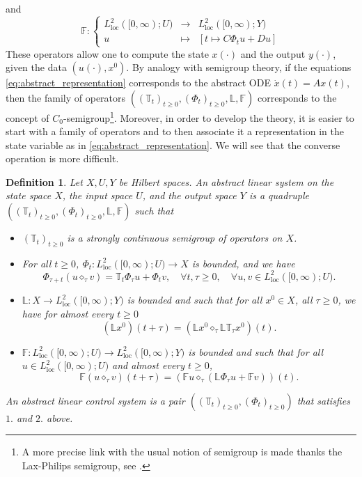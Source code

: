 \documentclass[10pt]{article}
\newcommand{\oploc}{\operatorname{loc}}
\newtheorem{Definition}[Theorem]{Definition}
\begin{document}
and 
\[
\mathbb{F} : \left\lbrace \begin{array}{ccc}
    L_{\oploc}^2([0,\infty);U) & \longrightarrow & L_{\oploc}^2([0,\infty);Y)  \\
    u & \longmapsto &  [t \mapsto C \Phi_t u+Du]
\end{array}\right.
\]
These operators allow one to compute the state $x(\cdot)$ and the output $y(\cdot)$, given the data $(u(\cdot),x^0)$. By analogy with semigroup theory, if the equations \eqref{eq:abstract_representation} corresponds to the abstract ODE $\dot{x}(t) = Ax(t)$, then the family of operators $((\mathbb{T}_t)_{t \geq 0},(\Phi_t)_{t \geq 0}, \mathbb{L}, \mathbb{F})$ corresponds to the concept of $C_0$-semigroup\footnote{A more precise link with the usual notion of semigroup is made thanks the Lax-Philips semigroup, see \cite[Chapter 2.7]{staffans2006well}.}. Moreover, in order to develop the theory, it is easier to start with a family of operators and to then associate it a representation in the state variable as in \eqref{eq:abstract_representation}. We will see that the converse operation is more difficult. 
\begin{Definition}\label{def:abstract_linear_system} Let $X,U,Y$ be Hilbert spaces. An abstract linear system on the state space $X$, the input space $U$, and the output space $Y$ is a quadruple $((\mathbb{T}_t)_{t \geq 0},(\Phi_t)_{t \geq 0},\mathbb{L}, \mathbb{F})$ such that 
\begin{itemize}
    \item[1.] $(\mathbb T_t)_{t\geq 0}$ is a strongly continuous semigroup of operators on $X$.
    \item[2.] For all $t \geq 0$, $\Phi_t : L^2_{\mathrm{loc}}([0,\infty);U) \rightarrow X$ is bounded, and we have 
    \begin{equation}\label{eq:composition}
\Phi_{\tau+t}(u \diamond_\tau v)
= \mathbb T_t \Phi_\tau u + \Phi_t v,\quad \forall t,\tau \geq 0,\quad \forall u,v \in L^2_{\oploc}([0,\infty);U).
\end{equation}
    \item[3.] $\mathbb{L} : X \rightarrow L_{\oploc}^2([0,\infty);Y)$ is bounded and such that for all $x^0 \in X$, all $\tau \geq 0$, we have for almost every $t \geq 0$
    \begin{equation*}
(\mathbb{L}x^0)(t+\tau)
= \left( \mathbb{L}x^0 \diamond_\tau {\mathbb L} \mathbb T_\tau x^0\right)(t).
\end{equation*}
    \item[4.] $\mathbb{F} : L^2_{\oploc}([0,\infty);U) \rightarrow L_{\oploc}^2([0,\infty);Y)$ is bounded and such that for all $u \in L^2_{\oploc}([0,\infty);U)$ and almost every $t \geq 0$, 
    \begin{equation*}%
\mathbb{F}(u \diamond_\tau v)(t+\tau) = \left( \mathbb{F} u \diamond_\tau ( \mathbb{L}\Phi_\tau u + \mathbb{F} v)\right)(t).
\end{equation*}
\end{itemize}
An abstract linear control system is a pair $((\mathbb{T}_t)_{t \geq 0},(\Phi_t)_{t \geq 0})$ that satisfies $1.$ and $2.$ above. 
\end{Definition}
\end{document}
